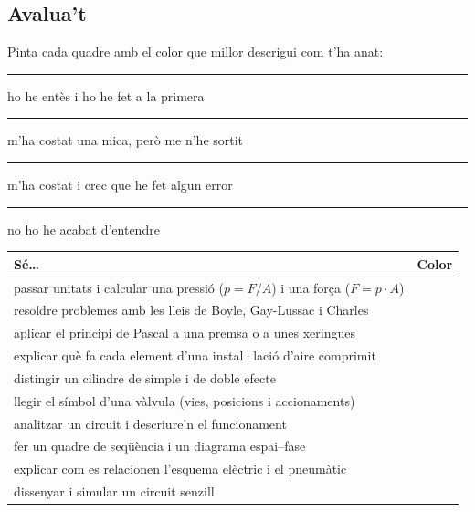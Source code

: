 \subsection*{Avalua't}

Pinta cada quadre amb el color que millor descrigui com t'ha anat:
\begin{center}
\textcolor{verd}{\rule{1em}{1em}} ho he entès i ho he fet a la primera \quad
\textcolor{blau}{\rule{1em}{1em}} m'ha costat una mica, però me n'he sortit\\
\textcolor{taronja}{\rule{1em}{1em}} m'ha costat i crec que he fet algun error \quad
\textcolor{vermell}{\rule{1em}{1em}} no ho he acabat d'entendre
\end{center}
\renewcommand{\arraystretch}{1.7}
\begin{center}
\begin{tabular}{@{}p{12.4cm}|c|@{}}
\toprule
\textbf{Sé\ldots} & \textbf{Color}\\\midrule
passar unitats i calcular una pressió ($p = F/A$) i una força ($F = p\cdot A$) & \hspace{1.2cm}\\\hline
resoldre problemes amb les lleis de Boyle, Gay-Lussac i Charles & \\\hline
aplicar el principi de Pascal a una premsa o a unes xeringues & \\\hline
explicar què fa cada element d'una instal·lació d'aire comprimit & \\\hline
distingir un cilindre de simple i de doble efecte & \\\hline
llegir el símbol d'una vàlvula (vies, posicions i accionaments) & \\\hline
analitzar un circuit i descriure'n el funcionament & \\\hline
fer un quadre de seqüència i un diagrama espai--fase & \\\hline
explicar com es relacionen l'esquema elèctric i el pneumàtic & \\\hline
dissenyar i simular un circuit senzill & \\
\bottomrule
\end{tabular}
\end{center}
